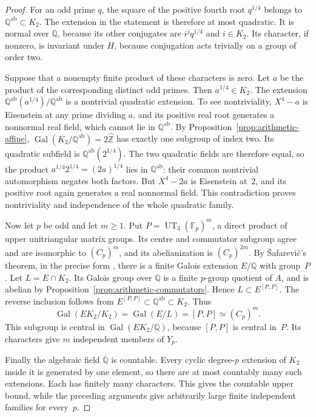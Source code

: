 \begin{proof}
For an odd prime $q$, the square of the positive fourth root $q^{1/4}$
belongs to $\mathbb Q^{\mathrm{ab}}\subset K_2$. The extension in the
statement is therefore at most quadratic. It is normal over $\mathbb Q$,
because its other conjugates are $i^j q^{1/4}$ and $i\in K_2$.
Its character, if nonzero, is invariant under $H$, because conjugation
acts trivially on a group of order two.

Suppose that a nonempty finite product of these characters is zero.
Let $a$ be the product of the corresponding distinct odd primes. Then
$a^{1/4}\in K_2$. The extension
$\mathbb Q^{\mathrm{ab}}(a^{1/4})/\mathbb Q^{\mathrm{ab}}$ is a
nontrivial quadratic extension. To see nontriviality, $X^4-a$ is
Eisenstein at any prime dividing $a$, and its positive real root
generates a nonnormal real field, which cannot lie in
$\mathbb Q^{\mathrm{ab}}$. By Proposition~\ref{prop:arithmetic-affine},
$\operatorname{Gal}(K_2/\mathbb Q^{\mathrm{ab}})=2\widehat{\mathbb Z}$
has exactly one subgroup of index two. Its quadratic subfield is
$\mathbb Q^{\mathrm{ab}}(2^{1/4})$. The two quadratic fields are
therefore equal, so the product $a^{1/4}2^{1/4}=(2a)^{1/4}$ lies in
$\mathbb Q^{\mathrm{ab}}$: their common nontrivial automorphism negates
both factors. But $X^4-2a$ is Eisenstein at~$2$, and its positive root
again generates a real nonnormal field. This contradiction proves
nontriviality and independence of the whole quadratic family.

Now let $p$ be odd and let $m\geq1$. Put
$P=\operatorname{UT}_3(\mathbb F_p)^m$, a direct product of upper
unitriangular matrix groups. Its centre and commutator subgroup agree
and are isomorphic to $(C_p)^m$, and its abelianization is
$(C_p)^{2m}$. By \v{S}afarevi\v{c}'s theorem, in the precise form
\cite[Theorem~1, p.~1]{SchmidtWingberg}, there is a finite Galois
extension $E/\mathbb Q$ with group~$P$.
Let $L=E\cap K_2$. Its Galois group over $\mathbb Q$ is a finite
$p$-group quotient of $A$, and is abelian by
Proposition~\ref{prop:arithmetic-commutators}. Hence
$L\subset E^{[P,P]}$. The reverse inclusion follows from
$E^{[P,P]}\subset\mathbb Q^{\mathrm{ab}}\subset K_2$. Thus
\[
 \operatorname{Gal}(EK_2/K_2)=\operatorname{Gal}(E/L)=[P,P]
                  \simeq(C_p)^m.
\]
This subgroup is central in $\operatorname{Gal}(EK_2/\mathbb Q)$,
because $[P,P]$ is central in~$P$. Its characters give $m$ independent
members of $Y_p$.

Finally the algebraic field $\overline{\mathbb Q}$ is countable.
Every cyclic degree-$p$ extension of $K_2$ inside it is generated by
one element, so there are at most countably many such extensions.
Each has finitely many characters. This gives the countable upper
bound, while the preceding arguments give arbitrarily large finite
independent families for every~$p$.
\end{proof}

